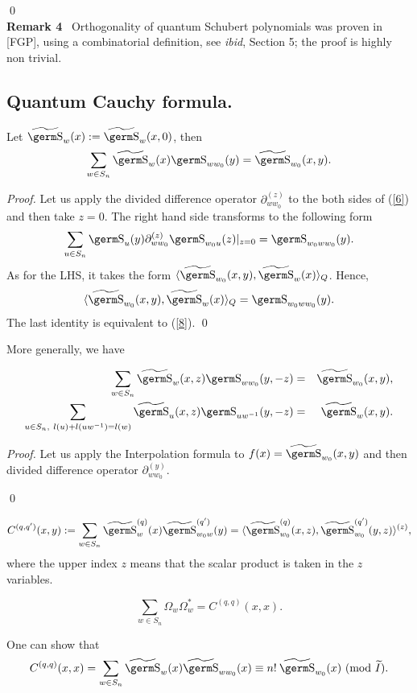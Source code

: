 {{\qed\smallskip \\
{\bf Remark 4} \ Orthogonality of quantum Schubert 
polynomials was proven in [FGP], using a combinatorial definition, see
{\it ibid}, Section 5; the proof is highly non trivial.

\subsection{Quantum Cauchy formula.}

\begin{th} Let $\wt{\s}_w(x):=\wt{\s}_w(x,0)$, then
\begin{equation}\sum_{w\in S_n}\wt{\s}_w(x)\s_{ww_0}(y)=\wt{\s}_{w_0}(x,y).
\label{8}
\end{equation}
\end{th}

{\it Proof.} Let us apply the divided difference operator 
$\partial_{ww_0}^{(z)}$ to the both sides of (\ref{6}) and then
take $z=0$. The right hand side transforms to the following form
$$\sum_{u\in 
S_n}\s_u(y)\partial_{ww_0}^{(z)}\s_{w_0u}(z)|_{z=0}=\s_{w_0ww_0}(y).
$$
As for the LHS, it takes the form 
$\langle\wt{\s}_{w_0}(x,y),\wt{\s}_w(x)\rangle_Q$. Hence,
$$\langle\wt{\s}_{w_0}(x,y),\wt{\s}_w(x)\rangle_Q=\s_{w_0ww_0}(y).
$$
The last identity is equivalent to (\ref{8}).
\qed

More generally, we have
\begin{pr}\label{104}
\begin{eqnarray}\sum_{w\in S_n}\wt{\s}_w(x,z)\s_{ww_0}(y,-z) &=&
\wt{\s}_{w_0}(x,y),\\
\sum_{u\in S_n,\ l(u)+l(uw^{-1})=l(w)}\wt{\s}_u(x,z)\s_{uw^{-1}}(y,-z) & = &
\wt{\s}_w(x,y).
\end{eqnarray}
\end{pr}

{\it Proof.} Let us apply the Interpolation formula to 
$f(x)=\wt{\s}_{w_0}(x,y)$ and then divided difference operator 
$\partial_{ww_0}^{(y)}$.

\qed
\begin{col}
$$C^{(q,q')}(x,y):=\sum_{w\in S_n}\wt{\s}_w^{(q)}(x)
\wt{\s}_{w_0w}^{(q')}(y)=\langle\wt{\s}_{w_0}^{(q)}(x,z),
\wt{\s}_{w_0}^{(q')}(y,z)\rangle^{(z)},
$$
where the upper index $z$ means that the scalar product is taken in the
$z$ variables.
\end{col}

\begin{col}\label{107}
$$\sum_{w\in S_n}\Omega_w\Omega_w^*=C^{(q,q)}(x,x).
$$
\end{col}
One can show that
$$C^{(q,q)}(x,x)=\sum_{w\in S_n}\wt{\s}_w(x)\wt{\s}_{ww_0}(x)\equiv n!\:
\wt{\s}_{w_0}(x)~(\mod\wt I).
$$

}}
